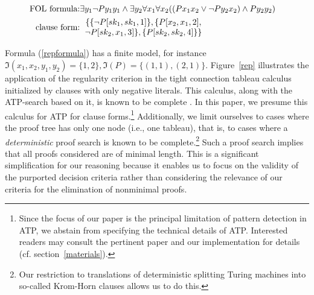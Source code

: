\documentclass[%
  manuscript=article,   %
  year=2024,
  volume=77,
  doi=00000.000,
]{zfn}
\begin{document}
\begin{eqnarray}
\mbox{FOL formula:} & \exists y_{1} \neg Py_{1}y_{1} \wedge \exists y_{2}\forall x_{1}\forall x_{2}((Px_{1}x_{2} \vee \neg Py_{2}x_{2}) \wedge Py_{2}y_{2}) & \label{repformula}  \\
\mbox{clause form:} & \begin{tabular}{c}$\{\{\neg P[sk_1,sk_1,1]\},\{P[x_{2},x_{1},2],$\\
$\neg P[sk_2,x_{1},3]\}, \{P[sk_2,sk_2,4]\}\}$\end{tabular} & \label{repclause}
\end{eqnarray}

Formula (\ref{repformula}) has a finite model, for instance $\Im(x_1,x_2,y_1,y_2) = \{1,2\}, \Im(P) = \{(1,1),(2,1)\}$.
Figure~\ref{rep} illustrates the application of the regularity criterion in the tight connection tableau calculus
initialized by clauses with only negative literals. \label{onenegative} This calculus, along with the ATP-search based on it, is known to be complete  \parencite[cf.][]{LetzStenz}. In this paper, we presume this calculus for ATP for clause forms.\footnote{Since the focus of our paper is the principal limitation of pattern detection in ATP, we abstain from specifying the technical details of ATP. Interested readers may consult the  pertinent paper \parencite{LetzStenz} and our implementation for details (cf. section~\ref{materials}).} Additionally, we limit ourselves to cases where the proof tree has only one node (i.e., one tableau), that is, to cases where a \emph{deterministic} proof search is known to be complete.\footnote{Our restriction to translations of deterministic splitting Turing machines into so-called Krom-Horn clauses allows us to do this.} Such a proof search implies that all proofs considered are of minimal length. This is a significant simplification for our reasoning because it enables us to focus on the validity of the purported decision criteria rather than considering the relevance of our criteria for the elimination of nonminimal proofs.
\end{document}
